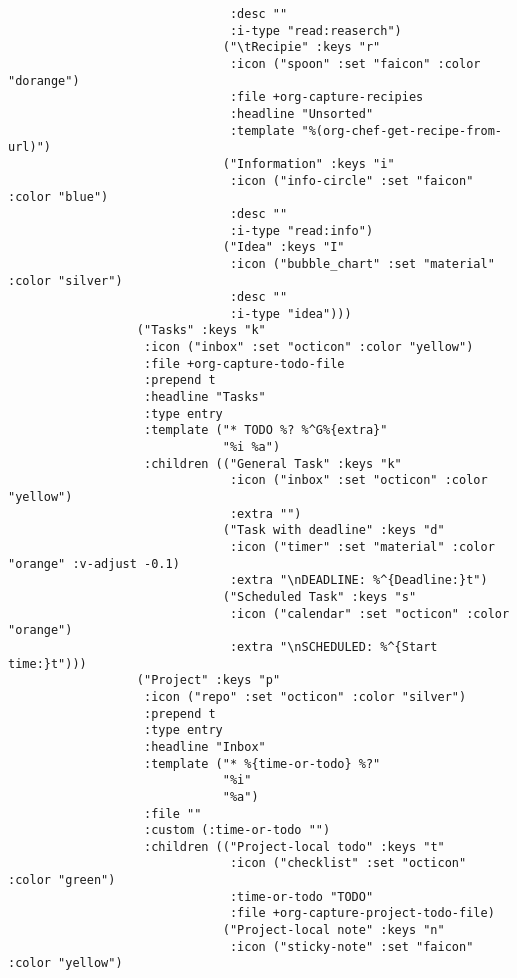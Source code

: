 \documentclass[c]{article}
\theoremstyle{plain}%
\theoremstyle{definition}
\theoremstyle{remark}
\begin{document}
\begin{verbatim}
                               :desc ""
                               :i-type "read:reaserch")
                              ("\tRecipie" :keys "r"
                               :icon ("spoon" :set "faicon" :color "dorange")
                               :file +org-capture-recipies
                               :headline "Unsorted"
                               :template "%(org-chef-get-recipe-from-url)")
                              ("Information" :keys "i"
                               :icon ("info-circle" :set "faicon" :color "blue")
                               :desc ""
                               :i-type "read:info")
                              ("Idea" :keys "I"
                               :icon ("bubble_chart" :set "material" :color "silver")
                               :desc ""
                               :i-type "idea")))
                  ("Tasks" :keys "k"
                   :icon ("inbox" :set "octicon" :color "yellow")
                   :file +org-capture-todo-file
                   :prepend t
                   :headline "Tasks"
                   :type entry
                   :template ("* TODO %? %^G%{extra}"
                              "%i %a")
                   :children (("General Task" :keys "k"
                               :icon ("inbox" :set "octicon" :color "yellow")
                               :extra "")
                              ("Task with deadline" :keys "d"
                               :icon ("timer" :set "material" :color "orange" :v-adjust -0.1)
                               :extra "\nDEADLINE: %^{Deadline:}t")
                              ("Scheduled Task" :keys "s"
                               :icon ("calendar" :set "octicon" :color "orange")
                               :extra "\nSCHEDULED: %^{Start time:}t")))
                  ("Project" :keys "p"
                   :icon ("repo" :set "octicon" :color "silver")
                   :prepend t
                   :type entry
                   :headline "Inbox"
                   :template ("* %{time-or-todo} %?"
                              "%i"
                              "%a")
                   :file ""
                   :custom (:time-or-todo "")
                   :children (("Project-local todo" :keys "t"
                               :icon ("checklist" :set "octicon" :color "green")
                               :time-or-todo "TODO"
                               :file +org-capture-project-todo-file)
                              ("Project-local note" :keys "n"
                               :icon ("sticky-note" :set "faicon" :color "yellow")

\end{verbatim}
\end{document}
